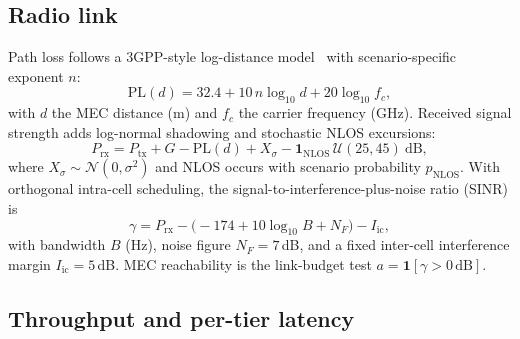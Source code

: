 \documentclass[10pt,conference]{IEEEtran}
\begin{document}
\subsection{Radio link}

Path loss follows a 3GPP-style log-distance model~\cite{3gpp38901} with
scenario-specific exponent $n$:
\begin{equation}
\mathrm{PL}(d) = 32.4 + 10\,n \log_{10} d + 20 \log_{10} f_c,
\label{eq:pl}
\end{equation}
with $d$ the MEC distance (m) and $f_c$ the carrier frequency (GHz).
Received signal strength adds log-normal shadowing and stochastic NLOS
excursions:
\begin{equation}
P_{\mathrm{rx}} = P_{\mathrm{tx}} + G - \mathrm{PL}(d) + X_\sigma
 - \mathbf{1}_{\mathrm{NLOS}}\,\mathcal{U}(25, 45)\ \text{dB},
\label{eq:rssi}
\end{equation}
where $X_\sigma \sim \mathcal{N}(0, \sigma^2)$ and NLOS occurs with
scenario probability $p_{\mathrm{NLOS}}$.  With orthogonal intra-cell
scheduling, the signal-to-interference-plus-noise ratio (SINR) is
\begin{equation}
\gamma = P_{\mathrm{rx}} - \bigl(-174 + 10\log_{10} B + N_F\bigr) - I_{\mathrm{ic}},
\label{eq:sinr}
\end{equation}
with bandwidth $B$ (Hz), noise figure $N_F = 7$\,dB, and a fixed
inter-cell interference margin $I_{\mathrm{ic}} = 5$\,dB.  MEC
reachability is the link-budget test $a = \mathbf{1}[\gamma > 0\,\text{dB}]$.

\subsection{Throughput and per-tier latency}
\end{document}
